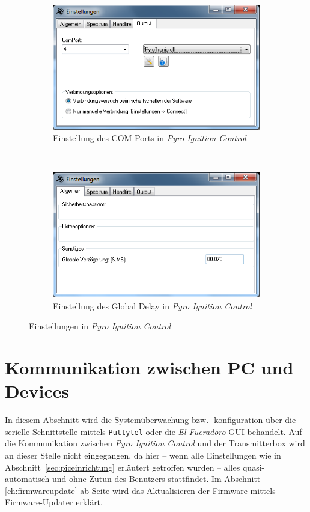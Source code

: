 \documentclass[pdftex, parskip, numbers=noenddot, toc=listof]{scrbook}
\newcommand{\pic}{\emph{Pyro Ignition Control}}
\newcommand{\anlage}{\emph{El Fueradoro}}
\begin{document}
			\begin{figure}
				\begin{subfigure}[t]{\textwidth}
					\centering
					\includegraphics[width=.75\textwidth]{Bilder/pic-comport}
					\caption{Einstellung des COM-Ports in {\pic}}
					\label{fig:pic-comport}
				\end{subfigure} \\[50pt]
				\begin{subfigure}[t]{\textwidth}
					\centering
					\includegraphics[width=.75\textwidth]{Bilder/pic-delay}
					\caption{Einstellung des Global Delay in \pic}
					\label{fig:pic-delay}
				\end{subfigure}
				\caption{Einstellungen in {\pic}}
			\end{figure}

	\chapter{Kommunikation zwischen PC und Devices}
		\label{ch:kommunikationpc}

		In diesem Abschnitt wird die Systemüberwachung bzw. -konfiguration über die serielle Schnittstelle mittels \texttt{Puttytel} oder die {\anlage}-GUI behandelt. Auf die Kommunikation zwischen {\pic} und der Transmitterbox wird an dieser Stelle nicht eingegangen, da hier -- wenn alle Einstellungen wie in Abschnitt~\ref{sec:piceinrichtung} erläutert getroffen wurden -- alles quasi-automatisch und ohne Zutun des Benutzers stattfindet. Im Abschnitt \ref{ch:firmwareupdate} ab Seite \pageref{ch:firmwareupdate} wird das Aktualisieren der Firmware mittels Firmware-Updater erklärt.
\end{document}
